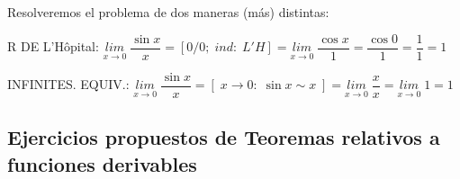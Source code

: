 	\begin{proofw}\renewcommand{\qedsymbol}{$\diamond$}	
		
		Resolveremos el problema de dos maneras (más) distintas:
		
		R DE L'Hôpital: $\underset{x\to 0}{lim}\;{\dfrac {\sin x}{x}}=[0/0; \; ind: \;  L'H] =\underset{x\to 0}{lim}\;{\dfrac {\cos x}{1}}= \dfrac {\cos 0}{1}=\dfrac 1 1 = 1$
		
		INFINITES. EQUIV.: $ \underset{x\to 0}{lim}\;{\dfrac {\sin x}{x}}= [\; x\to 0: \; \sin x \sim x \; ]=\underset{x\to 0}{lim}\;{\dfrac { x}{x}}= \underset{x\to 0}{lim}\;{1}=1$
	\end{proofw}




 \subsection {Ejercicios propuestos de Teoremas relativos a funciones derivables}

